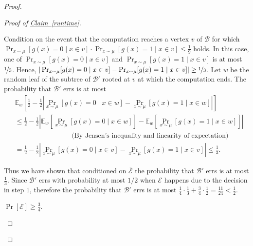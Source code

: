 \documentclass[11pt]{article}
\numberwithin{equation}{section}
\theoremstyle{definition}
\theoremstyle{plain}
\newcommand{\expref}[2]{\hyperref[#2]{#1~\ref{#2}}}
\newcommand{\dr}{\nicefrac}
\newcommand{\clB}{\mathcal{B}}
\newcommand{\clE}{\mathcal{E}}
\newcommand{\E}{\mathbb{E}}
\begin{document}
\begin{proof}
\begin{proof}[Proof of {\expref{Claim}{runtime}}]
\begin{description}
Condition on the event that the computation reaches a vertex $v$ of $\clB$ for which $\Pr_{x \sim \mu}[g(x)=0 \mid x \in v]\cdot\Pr_{x \sim \mu}[g(x)=1 \mid x \in v] \leq \frac{1}{9}$ holds. In this case, one of $\Pr_{x \sim \mu}[g(x)=0 \mid x \in v]$ and $\Pr_{x \sim \mu}[g(x)=1 \mid x \in v]$ is at most $\dr13$. Hence,  $|\Pr_{x \sim \mu}[g(x)=0 \mid x \in v]-\Pr_{x \sim \mu}[g(x)=1 \mid x \in v]| \geq \dr13$. Let $w$ be the random leaf of the subtree of $\clB'$ rooted at $v$ at which the computation ends. The probability that $\clB'$ errs is at most
\begin{align*}
&\E_w\left[\frac{1}{2}-\frac{1}{2}\left|\Pr_{x \sim \mu}[g(x)=0 \mid x \in w]-\Pr_{x \sim \mu}[g(x)=1 \mid x \in w]\right|\right] \\
& \leq \frac{1}{2}-\frac{1}{2} \left|\E_w\left[\Pr_{x \sim \mu}[g(x)=0 \mid x \in w]\right]-\E_w\left[\Pr_{x \sim \mu}[g(x)=1 \mid x \in w]\right]\right| \\
& \qquad \qquad \qquad \qquad \mbox{\ \ \ \ (By Jensen's inequality and linearity of expectation)} \\
&=\frac{1}{2}-\frac{1}{2}\left|\Pr_{x \sim \mu}[g(x)=0 \mid x \in v]-\Pr_{x \sim \mu}[g(x)=1 \mid x \in v]\right| \leq \frac{1}{3}.
\end{align*}

Thus we have shown that conditioned on $\overline{\clE}$ the probability that $\clB'$ errs is at most $\frac{1}{3}$. Since $\clB'$ errs with probability at most $1/2$ when $\clE$ happens due to the decision in step $1$, therefore the probability that $\clB'$ errs is at most $\frac{1}{4}\cdot \frac{1}{3}+\frac{3}{4}\cdot\frac{1}{2} = \frac{11}{24}<\frac{1}{2}$.
\item[Case $2$:] $\Pr[\clE] \geq \frac{3}{4}$.


\end{description}
\end{proof}
\end{proof}
\end{document}

